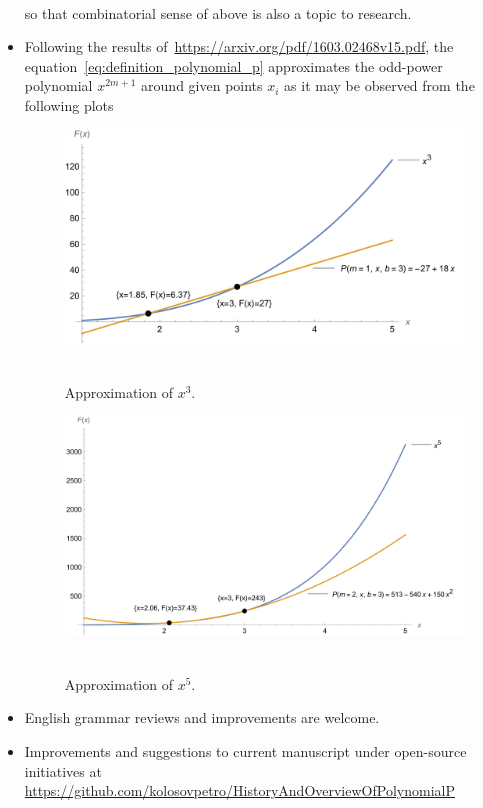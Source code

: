 \begin{itemize}
\begin{align*}
    \end{align*}
    so that combinatorial sense of above is also a topic to research.
    \item Following the results of~\url{https://arxiv.org/pdf/1603.02468v15.pdf},
    the equation~\eqref{eq:definition_polynomial_p} approximates the odd-power polynomial $x^{2m+1}$ around given points
    $x_i$ as it may be observed from the following plots
    \begin{figure}[H]
        \centering
        \includegraphics[width=1\textwidth]{images/n^3_approximation_m1_b3}
        ~\caption{Approximation of $x^3$.}\label{fig:approximation-n3}
    \end{figure}
    \begin{figure}[H]
        \centering
        \includegraphics[width=1\textwidth]{images/n^5_approximation_m2_b3}
        ~\caption{Approximation of $x^5$.}\label{fig:approximation-n5}
    \end{figure}
    \item English grammar reviews and improvements are welcome.
    \item Improvements and suggestions to current manuscript under open-source initiatives at
    \url{https://github.com/kolosovpetro/HistoryAndOverviewOfPolynomialP}
\end{itemize}
